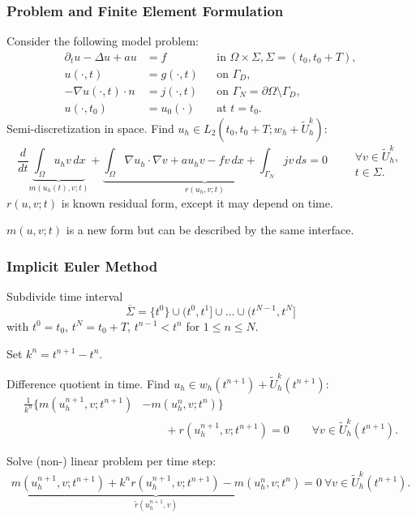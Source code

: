 \begin{frame}
\frametitle{Problem and Finite Element Formulation}
Consider the following model problem:
\begin{subequations} \label{Eq:Example03}
\begin{align*}
\partial_t u -\Delta u + a u &= f &&\text{in $\Omega\times\Sigma$}, \Sigma=(t_0,t_0+T),\\
u(\cdot,t) &= g(\cdot,t) && \text{on $\Gamma_D$},\\ 
-\nabla u(\cdot,t) \cdot n &= j(\cdot,t) &&\text{on $\Gamma_N=\partial\Omega\setminus\Gamma_D$},\\
u(\cdot,t_0) &= u_0(\cdot) && \text{at $t=t_0$}.
\end{align*}
\end{subequations}
Semi-discretization in space. Find $u_h\in L_2(t_0,t_0+T;w_h+\tilde{U}_h^k)$:
\begin{equation*}
\frac{d}{dt} \underbrace{\int_\Omega u_h v \,dx}_{m(u_h(t),v;t)} + \underbrace{\int_\Omega \nabla u_h \cdot \nabla v
+ a u_h v - f v \, dx + \int_{\Gamma_N} jv \, ds}_{r(u_h,v;t)} = 0 \qquad 
\begin{array}{l}
\forall v \in \tilde{U}_h^k,\\
t \in \Sigma.
\end{array}
\end{equation*}
$r(u,v;t)$ is known residual form, except it may depend on time.

$m(u,v;t)$ is a new form but can be described by the same interface.
\end{frame}

\begin{frame}
\frametitle{Implicit Euler Method}
Subdivide time interval
\begin{equation*}
\overline{\Sigma} = \{t^{0}\} \cup (t^0,t^1] \cup \ldots \cup (t^{N-1},t^N]
\end{equation*}
with $t^0=t_0$, $t^N=t_0+T$, $t^{n-1}<t^n$ for $1\leq n\leq N$.

Set $k^n=t^{n+1}-t^n$.

Difference quotient in time. Find $u_h \in w_h(t^{n+1}) + \tilde{U}_h^k(t^{n+1})$:
\begin{equation*}
\begin{split}
\frac{1}{k^n} \bigl\{ m\left(u_h^{n+1},v;t^{n+1}\right) &- m\left(u_h^{n},v;t^{n}\right)\bigr\} \\
&\qquad + r\left(u_h^{n+1},v;t^{n+1}\right) = 0
\qquad  \forall v \in \tilde{U}_h^k(t^{n+1}).
\end{split}
\end{equation*}

Solve (non-) linear problem per time step:
\begin{equation*}
\begin{split}
\underbrace{m\left(u_h^{n+1},v;t^{n+1}\right) + k^n r\left(u_h^{n+1},v;t^{n+1}\right)
 - m\left(u_h^{n},v;t^{n}\right)}_{\tilde{r}(u_h^{n+1},v)} = 0 \ \forall v \in \tilde{U}_h^k(t^{n+1}).
\end{split}
\end{equation*}
\end{frame}


